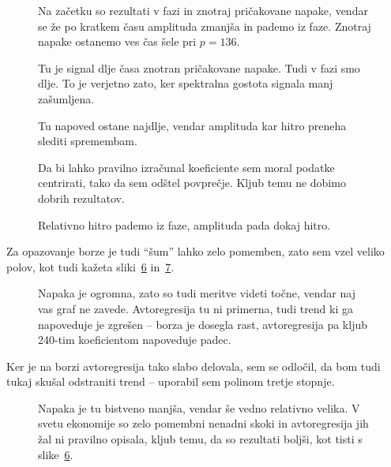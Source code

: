 \documentclass[a4 paper, 12pt]{article}
\begin{document}
\begin{figure}[H]\centering
	
	\caption{Na za\v cetku so rezultati v fazi in znotraj pri\v cakovane napake, vendar se \v ze po kratkem
		\v casu amplituda zmanj\v sa in pademo iz faze. Znotraj napake ostanemo ves \v cas \v sele pri
		$p = 136$.}
	\label{pred1}
\end{figure}

\begin{figure}[H]\centering
	
	\caption{Tu je signal dlje \v casa znotran pri\v cakovane napake. Tudi v fazi smo dlje. To je verjetno zato,
		ker spektralna gostota signala manj za\v sumljena.}
	\label{pred2}
\end{figure}

\begin{figure}[H]\centering
	
	\caption{Tu napoved ostane najdlje, vendar amplituda kar hitro preneha slediti spremembam.}
	\label{pred3}
\end{figure}

\begin{figure}[H]\centering
	
	\caption{Da bi lahko pravilno izra\v cunal koeficiente sem moral podatke centrirati, tako da sem
		od\v stel povpre\v cje. Kljub temu ne dobimo dobrih rezultatov.}
	\label{pred4}
\end{figure}

\begin{figure}[H]\centering
	
	\caption{Relativno hitro pademo iz faze, amplituda pada dokaj hitro.}
	\label{pred5}
\end{figure}
Za opazovanje borze je tudi "`\v sum"' lahko zelo pomemben, zato sem vzel veliko polov, kot tudi ka\v zeta sliki~\ref{pred6}
in~\ref{pred7}.
\begin{figure}[H]\centering
	
	\caption{Napaka je ogromna, zato so tudi meritve videti to\v cne, vendar naj vas graf ne zavede.
		Avtoregresija tu ni primerna, tudi trend ki ga napoveduje je zgre\v sen -- borza je dosegla rast,
		avtoregresija pa kljub 240-tim koeficientom napoveduje padec.}
	\label{pred6}
\end{figure}
Ker je na borzi avtoregresija tako slabo delovala, sem se odlo\v cil, da bom tudi tukaj sku\v sal odstraniti
trend -- uporabil sem polinom tretje stopnje.
\begin{figure}[H]\centering
	
	\caption{Napaka je tu bistveno manj\v sa, vendar \v se vedno relativno velika. V svetu ekonomije so
		zelo pomembni nenadni skoki in avtoregresija jih \v zal ni pravilno opisala, kljub temu, da so
		rezultati bolj\v si, kot tisti s slike~\ref{pred6}.}
	\label{pred7}
\end{figure}
\end{document}
